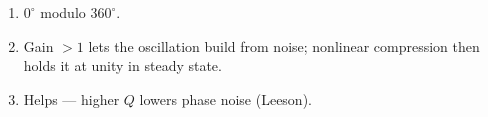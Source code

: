 \begin{enumerate}[leftmargin=1.6em,itemsep=2pt]
\item $0^{\circ}$ modulo $360^{\circ}$.
\item Gain $>1$ lets the oscillation build from noise; nonlinear compression then holds it at unity in steady state.
\item Helps --- higher $Q$ lowers phase noise (Leeson).
\end{enumerate}
